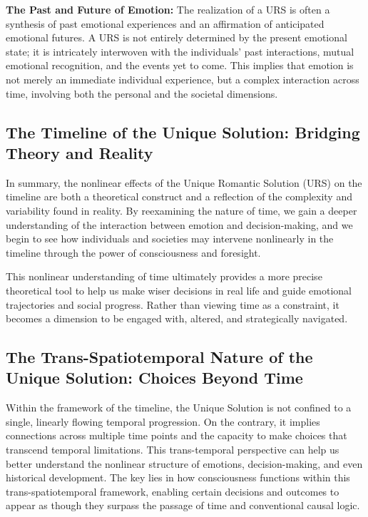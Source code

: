 \documentclass[12pt]{article}
\begin{document}
\textbf{The Past and Future of Emotion:} The realization of a URS is often a synthesis of past emotional experiences and an affirmation of anticipated emotional futures. A URS is not entirely determined by the present emotional state; it is intricately interwoven with the individuals' past interactions, mutual emotional recognition, and the events yet to come. This implies that emotion is not merely an immediate individual experience, but a complex interaction across time, involving both the personal and the societal dimensions.
\subsection{The Timeline of the Unique Solution: Bridging Theory and Reality}

In summary, the nonlinear effects of the Unique Romantic Solution (URS) on the timeline are both a theoretical construct and a reflection of the complexity and variability found in reality. By reexamining the nature of time, we gain a deeper understanding of the interaction between emotion and decision-making, and we begin to see how individuals and societies may intervene nonlinearly in the timeline through the power of consciousness and foresight.

This nonlinear understanding of time ultimately provides a more precise theoretical tool to help us make wiser decisions in real life and guide emotional trajectories and social progress. Rather than viewing time as a constraint, it becomes a dimension to be engaged with, altered, and strategically navigated.

\subsection{The Trans-Spatiotemporal Nature of the Unique Solution: Choices Beyond Time}

Within the framework of the timeline, the Unique Solution is not confined to a single, linearly flowing temporal progression. On the contrary, it implies connections across multiple time points and the capacity to make choices that transcend temporal limitations. This trans-temporal perspective can help us better understand the nonlinear structure of emotions, decision-making, and even historical development. The key lies in how consciousness functions within this trans-spatiotemporal framework, enabling certain decisions and outcomes to appear as though they surpass the passage of time and conventional causal logic.
\end{document}
